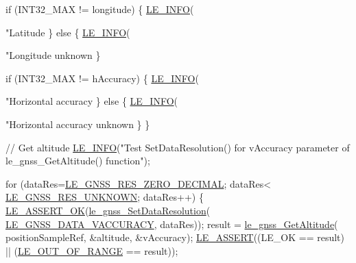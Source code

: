 \begin{DoxyCodeInclude}
{{{{{{{{{{{{{{{        \textcolor{keywordflow}{if} (INT32\_MAX != longitude)
        \{
            \hyperlink{le__log_8h_a23e6d206faa64f612045d688cdde5808}{LE\_INFO}(\textcolor{stringliteral}{"Latitude %
        \}
        \textcolor{keywordflow}{else}
        \{
            \hyperlink{le__log_8h_a23e6d206faa64f612045d688cdde5808}{LE\_INFO}(\textcolor{stringliteral}{"Longitude unknown %
        \}

        \textcolor{keywordflow}{if} (INT32\_MAX != hAccuracy)
        \{
            \hyperlink{le__log_8h_a23e6d206faa64f612045d688cdde5808}{LE\_INFO}(\textcolor{stringliteral}{"Horizontal accuracy %
        \}
        \textcolor{keywordflow}{else}
        \{
            \hyperlink{le__log_8h_a23e6d206faa64f612045d688cdde5808}{LE\_INFO}(\textcolor{stringliteral}{"Horizontal accuracy unknown %
        \}
    \}

    \textcolor{comment}{// Get altitude}
    \hyperlink{le__log_8h_a23e6d206faa64f612045d688cdde5808}{LE\_INFO}(\textcolor{stringliteral}{"Test SetDataResolution() for vAccuracy parameter of le\_gnss\_GetAltitude() function"});

    \textcolor{keywordflow}{for} (dataRes=\hyperlink{le__gnss__interface_8h_aaf5d256c75737a2189c8da7bfed5da0da17a6752c8b3a5f04e6e32503eb8336ab}{LE\_GNSS\_RES\_ZERO\_DECIMAL}; dataRes<
      \hyperlink{le__gnss__interface_8h_aaf5d256c75737a2189c8da7bfed5da0dac09593667cfb123368ea6890f081ade9}{LE\_GNSS\_RES\_UNKNOWN}; dataRes++)
    \{
        \hyperlink{le__log_8h_a7cd2daa3d4af1de4d29e0eed95187484}{LE\_ASSERT\_OK}(\hyperlink{le__gnss__interface_8h_a4cfa7d0e69ad462f09af7d6a596cbea5}{le\_gnss\_SetDataResolution}(
      \hyperlink{le__gnss__interface_8h_a4517118b39910a4f3f8b08cd5a3a671ca82b77d055b809c8d04bc2824061134e1}{LE\_GNSS\_DATA\_VACCURACY}, dataRes));
        result = \hyperlink{le__gnss__interface_8h_a5cc278268a4e75c5e2a5f8c1ffb64fa9}{le\_gnss\_GetAltitude}( positionSampleRef, &altitude, &vAccuracy);
        \hyperlink{le__log_8h_ac0dbbef91dc0fed449d0092ff0557b39}{LE\_ASSERT}((LE\_OK == result) || (\hyperlink{le__basics_8h_a1cca095ed6ebab24b57a636382a6c86caef8ecf11fa8556fd2d3ca8faab697717}{LE\_OUT\_OF\_RANGE} == result));

}}}}}}}}}}}}}}}}}}}
\end{DoxyCodeInclude}
